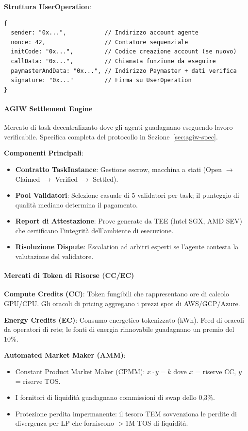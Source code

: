\documentclass[11pt]{article}
\begin{document}
\textbf{Struttura UserOperation}:
\begin{verbatim}
{
  sender: "0x...",           // Indirizzo account agente
  nonce: 42,                 // Contatore sequenziale
  initCode: "0x...",         // Codice creazione account (se nuovo)
  callData: "0x...",         // Chiamata funzione da eseguire
  paymasterAndData: "0x...", // Indirizzo Paymaster + dati verifica
  signature: "0x..."         // Firma su UserOperation
}
\end{verbatim}

\paragraph{AGIW Settlement Engine}
Mercato di task decentralizzato dove gli agenti guadagnano eseguendo lavoro verificabile. Specifica completa del protocollo in Sezione~\ref{sec:agiw-spec}.

\textbf{Componenti Principali}:
\begin{itemize}[noitemsep]
  \item \textbf{Contratto TaskInstance}: Gestione escrow, macchina a stati (Open $\to$ Claimed $\to$ Verified $\to$ Settled).
  \item \textbf{Pool Validatori}: Selezione casuale di 5 validatori per task; il punteggio di qualità mediano determina il pagamento.
  \item \textbf{Report di Attestazione}: Prove generate da TEE (Intel SGX, AMD SEV) che certificano l'integrità dell'ambiente di esecuzione.
  \item \textbf{Risoluzione Dispute}: Escalation ad arbitri esperti se l'agente contesta la valutazione del validatore.
\end{itemize}

\paragraph{Mercati di Token di Risorse (CC/EC)}
\textbf{Compute Credits (CC)}: Token fungibili che rappresentano ore di calcolo GPU/CPU. Gli oracoli di pricing aggregano i prezzi spot di AWS/GCP/Azure.

\textbf{Energy Credits (EC)}: Consumo energetico tokenizzato (kWh). Feed di oracoli da operatori di rete; le fonti di energia rinnovabile guadagnano un premio del 10\%.

\textbf{Automated Market Maker (AMM)}:
\begin{itemize}[noitemsep]
  \item Constant Product Market Maker (CPMM): $x \cdot y = k$ dove $x$ = riserve CC, $y$ = riserve TOS.
  \item I fornitori di liquidità guadagnano commissioni di swap dello 0,3\%.
  \item Protezione perdita impermanente: il tesoro TEM sovvenziona le perdite di divergenza per LP che forniscono $>$1M TOS di liquidità.
\end{itemize}
\end{document}

